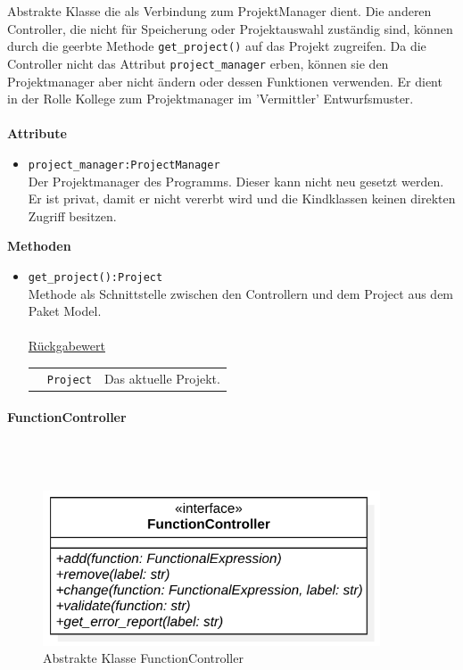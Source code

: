 \documentclass{article}
\newcommand{\classheader}[2][]{\paragraph{#2}
\mbox{}\textit{#1}\\\\}
\begin{document}
Abstrakte Klasse die als Verbindung zum ProjektManager dient. Die anderen Controller, die nicht für Speicherung oder Projektauswahl zuständig sind, können durch die geerbte Methode \texttt{get\_project()} auf das Projekt zugreifen. Da die Controller nicht das Attribut \texttt{project\_manager} erben, können sie den Projektmanager aber nicht ändern oder dessen Funktionen verwenden. Er dient in der Rolle Kollege zum 
Projektmanager im 'Vermittler' Entwurfsmuster.
\\\\
\textbf{\large{Attribute}}
\begin{itemize}
\item \texttt{project\_manager:ProjectManager}\\ Der Projektmanager des Programms. Dieser kann nicht neu gesetzt werden. Er ist privat, damit er nicht vererbt wird und die Kindklassen keinen direkten Zugriff besitzen.
\end{itemize}\leavevmode\newline
\textbf{\large{Methoden}}
\begin{itemize}
\item \texttt{get\_project():Project}\\ Methode als Schnittstelle zwischen den Controllern und dem Project aus dem Paket Model.\\\\
\underline{{Rückgabewert}}\\
\begin{tabular}{lll}
 & \texttt{Project} & Das aktuelle Projekt. \\
\end{tabular}
\end{itemize}



\newpage
\classheader{FunctionController}\label{cls:FunctionController}

\begin{figure}[H]%
    \centering
    \includegraphics[width=10cm]{entwurf/Floriane/FunctionController.png}
    \caption{Abstrakte Klasse FunctionController}
\end{figure}
\end{document}

